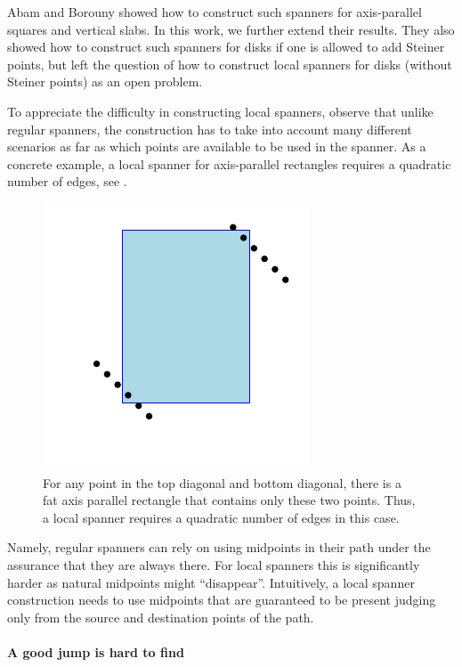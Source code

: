 Abam and Borouny \cite{ab-lgs-21} showed how to construct such
spanners for axis-parallel squares and vertical slabs. In this work,
we further extend their results.  They also showed how to
construct such spanners for disks if one is allowed to add Steiner
points, but left the question of how to construct local
spanners for disks (without Steiner points) as an open problem.

To appreciate the difficulty in constructing local spanners, observe
that unlike regular spanners, the construction has to take into
account many different scenarios as far as which points are available
to be used in the spanner. As a concrete example, a local spanner for
axis-parallel rectangles requires a quadratic number of edges, see
.

\begin{figure}[h]
    \centerline{\includegraphics{../figs/local_rectangles}}
    \caption{For any point in the top diagonal and bottom diagonal,
       there is a fat axis parallel rectangle that contains only these
       two points. Thus, a local spanner requires a quadratic number of edges in
       this case.  }
\end{figure}

Namely, regular spanners can rely on using midpoints in their path
under the assurance that they are always there. For local spanners
this is significantly harder as natural midpoints might
``disappear''. Intuitively, a local spanner construction needs to use
midpoints that are guaranteed to be present judging only from the
source and destination points of the path.

\paragraph*{A good jump is hard to find}

